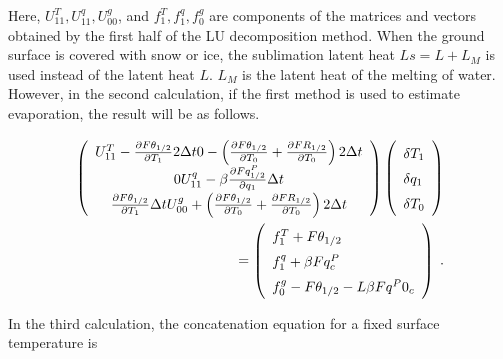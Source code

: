 Here, \(U_{11}^T, U_{11}^q, U_{00}^g\), and \(f_1^T, f_1^q, f_0^g\) are components of the matrices and vectors obtained by the first half of the LU decomposition method. When the ground surface is
covered with snow or ice, the sublimation latent heat \(Ls = L + L_M\) is used instead of the latent heat \(L\). \(L_M\) is the latent heat of the melting of water. However, in the second calculation,
if the first method is used to estimate evaporation, the result will be as follows.

\begin{eqnarray}
 \renewcommand{\arraystretch}{1.5}
  \left( \begin{array}{ccc}
      U_{11}^T - \frac{\partial{F\theta_{1/2}}}{\partial {T_1}} 2 \Delta t
      0
      - \left( \frac{\partial{F\theta_{1/2}}}{\partial {T_0}}
                         + \frac{\partial{FR_{1/2}}}{\partial {T_0}}\right) 2 \Delta t \\
      0
      U_{11}^q - \beta \frac{\partial{Fq^P_{1/2}}}{\partial {q_1}} \Delta t  \\
        \frac{\partial{F\theta_{1/2}}}{\partial {T_1}} \Delta t
      U_{00}^g + \left(\frac{\partial{F\theta_{1/2}}}{\partial {T_0}}
                + \frac{\partial{FR_{1/2}}}{\partial {T_0}} \right) 2 \Delta t \\
  \end{array} \right)
  \left( \begin{array}{l}
      \delta T_1 \\ \delta q_1 \\ \delta T_0 \\
  \end{array} \right)   \\
=
  \left( \begin{array}{l}
      f_1^T + F\theta_{1/2} \\
      f_1^q + \beta Fq^P_c \\
      f_0^g - F\theta_{1/2} - L \beta Fq^P0_c \\
  \end{array} \right) \; .
\end{eqnarray}

In the third calculation, the concatenation equation for a fixed surface temperature is

